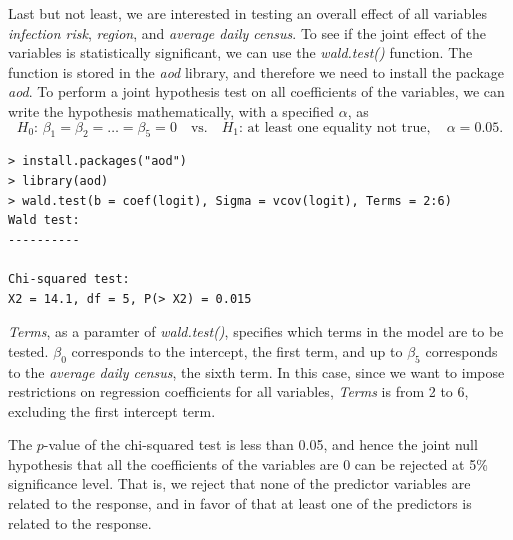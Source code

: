 \documentclass[11pt]{article}
\begin{document}
Last but not least, we are interested in testing an overall effect of all variables \textit{infection risk}, \textit{region}, and \textit{average daily census}.  To see if the joint effect of the variables is statistically significant, we can use the \textit{wald.test()} function. The function is stored in the \textit{aod} library, and therefore we need to install the package \textit{aod}. To perform a joint hypothesis test on all coefficients of the variables, we can write the hypothesis mathematically, with a specified $\alpha$, as
\[
\textit{H}_0:\,\beta_{1}=\beta_{2}=\dots=\beta_{5}=0\quad\textrm{vs.}\quad\textit{H}_1:\,\textrm{at least one equality not true}, \quad \alpha=0.05.
\]

\begin{commandline}
\begin{verbatim}
> install.packages("aod")
> library(aod) 
> wald.test(b = coef(logit), Sigma = vcov(logit), Terms = 2:6)
Wald test:
----------

Chi-squared test:
X2 = 14.1, df = 5, P(> X2) = 0.015
\end{verbatim}
\end{commandline}
\textit{Terms}, as a paramter of \textit{wald.test()}, specifies which terms in the model are to be tested. $\beta_{0}$ corresponds to the intercept, the first term, and up to $\beta_{5}$ corresponds to the \textit{average daily census}, the sixth term. In this case, since we want to impose restrictions on regression coefficients for all variables, \textit{Terms} is from 2 to 6, excluding the first intercept term. 

The $p$-value of the chi-squared test is less than 0.05, and hence the joint null hypothesis that all the coefficients of the variables are 0 can be rejected at 5\% significance level. That is, we reject that none of the predictor variables are related to the response, and in favor of that at least one of the predictors is related to the response.
\end{document}
